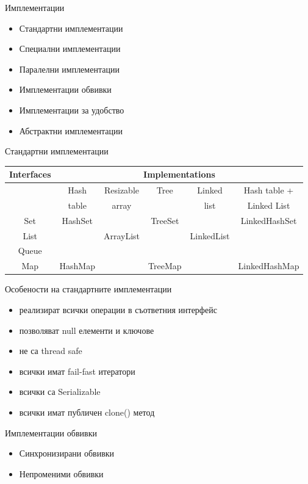 \documentclass{beamer}
\begin{document}
\begin{frame}{Имплементации}
  \transdissolve
  \begin{itemize}
  \item Стандартни имплементации
  \item Специални имплементации
  \item Паралелни имплементации
  \item Имплементации обвивки
  \item Имплементации за удобство
  \item Абстрактни имплементации
  \end{itemize}
\end{frame}


\begin{frame}{Стандартни имплементации}
  \transdissolve
  \begin{tabular}{|c|c|c|c|c|c|}
    \hline
    Interfaces & \multicolumn{5}{|c|}{Implementations}  \\
    \hline
    \hline
    & Hash & Resizable & Tree & Linked & Hash table + \\
    & table & array & & list & Linked List \\
    \hline
    Set & HashSet & & TreeSet & & LinkedHashSet \\
    \hline
    List & & ArrayList & & LinkedList \\
    \hline
    Queue & & & & & \\
    \hline
    Map & HashMap & & TreeMap & & LinkedHashMap \\
    \hline
  \end{tabular}

\end{frame}

\begin{frame}{Особености на стандартните имплементации}
\transdissolve
\begin{itemize}
\item реализират всички операции в съответния интерфейс
\item позволяват null елементи и ключове
\item не са thread safe
\item всички имат fail-fast итератори
\item всички са Serializable
\item всички имат публичен clone() метод
\end{itemize}
\end{frame}

\begin{frame}{Имплементации обвивки}
  \transdissolve
  \begin{itemize}
  \item Синхронизирани обвивки
  \item Непроменими обвивки
  \end{itemize}
\end{frame}
\end{document}
